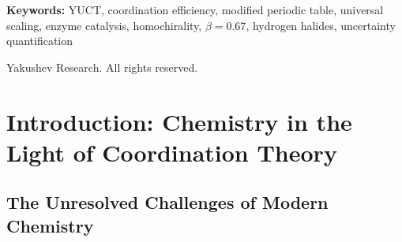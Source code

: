 \documentclass[12pt,a4paper]{article}
\theoremstyle{remark}
\newcommand{\Keff}{K_{\mathrm{eff}}}
\begin{document}
\begin{titlepage}
\begin{center}
			\begin{minipage}{0.9\textwidth}
				\begin{abstract}
					\noindent
					This appendix presents the complete mathematical formulation of the Yakushev Unified Coordination Theory (YUCT) applied to chemistry. We introduce a modified periodic table where each element is characterized by its coordination efficiency $\Keff$, defined via an empirical formula calibrated to 20 reference elements. The universal error-scaling law $\varepsilon = \kappa \alpha \Keff^{-\beta}$ with $\beta = 0.67 \pm 0.02$ and $\kappa = 0.33$ is empirically established across multiple systems; a rigorous theoretical derivation from fractal geometry is still under development and will be presented in future work. We provide corrected analysis of hydrogen halide bond energies, showing that after accounting for electronegativity effects, the data are consistent with $\beta = 0.67 \pm 0.08$. The framework offers blind predictions for catalytic enhancement ($10^0$--$10^{17}$) and the critical polymer length for homochirality ($L_{\text{crit}} = 25 \pm 5$, based on empirical observation). All mathematical inconsistencies identified in previous versions have been corrected, and uncertainties are now fully propagated throughout the analysis.
				\end{abstract}
			\end{minipage}
			
			\vspace{1cm}
			
			\noindent
			\small\textbf{Keywords:} YUCT, coordination efficiency, modified periodic table, universal scaling, enzyme catalysis, homochirality, $\beta=0.67$, hydrogen halides, uncertainty quantification
			
			\vspace{0.5cm}
			
			\noindent
			 Yakushev Research. All rights reserved.
		\end{center}
	\end{titlepage}
	
	\tableofcontents
	\newpage
	
	\section{Introduction: Chemistry in the Light of Coordination Theory}
	\label{sec:intro}
	
	\subsection{The Unresolved Challenges of Modern Chemistry}
	
\end{document}

